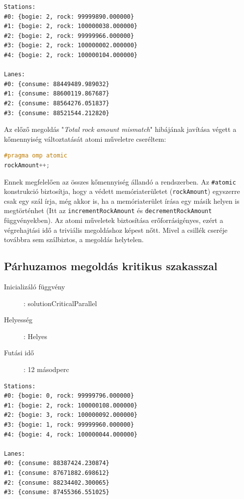 \documentclass[a4paper,10pt]{article}
\begin{document}
\begin{lstlisting}
Stations:
#0: {bogie: 2, rock: 99999890.000000}
#1: {bogie: 2, rock: 100000038.000000}
#2: {bogie: 2, rock: 99999966.000000}
#3: {bogie: 2, rock: 100000002.000000}
#4: {bogie: 2, rock: 100000104.000000}

Lanes:
#0: {consume: 88449489.989032}
#1: {consume: 88600119.867687}
#2: {consume: 88564276.051837}
#3: {consume: 88521544.212820}
\end{lstlisting}

Az előző megoldás "\emph{Total rock amount mismatch}" hibájának javítása végett a kőmennyiség változtatását atomi műveletre cseréltem:

\begin{lstlisting}[language=c]
#pragma omp atomic
rockAmount++;
\end{lstlisting}

Ennek megfelelően az összes kőmennyiség állandó a rendszerben. Az \texttt{\#atomic} konstrukció biztosítja, hogy a védett memóriaterületet (\texttt{rockAmount}) egyszerre csak egy szál írja, még akkor is, ha a memóriaterület írása egy másik helyen is megtörténhet (Itt az \texttt{incrementRockAmount} és \texttt{decrementRockAmount} függvényekben). 
Az atomi műveletek biztosítása erőforrásigényes, ezért a végrehajtási idő a triviális megoldáshoz képest nőtt. Mivel a csillék cseréje továbbra sem szálbiztos, a megoldás helytelen.

    \subsection{Párhuzamos megoldás kritikus szakasszal}
\begin{description}
  \item[Inicializáló függvény]: solutionCriticalParallel
  \item[Helyesség]: Helyes
  \item[Futási idő]: 12 másodperc
\end{description}

\begin{lstlisting}
Stations:
#0: {bogie: 0, rock: 99999796.000000}
#1: {bogie: 2, rock: 100000108.000000}
#2: {bogie: 3, rock: 100000092.000000}
#3: {bogie: 1, rock: 99999960.000000}
#4: {bogie: 4, rock: 100000044.000000}

Lanes:
#0: {consume: 88387424.230874}
#1: {consume: 87671882.698612}
#2: {consume: 88234402.300065}
#3: {consume: 87455366.551025}
\end{lstlisting}
\end{document}
